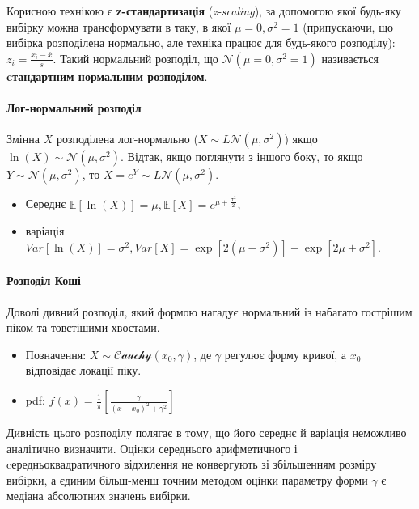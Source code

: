 \documentclass[
  11pt,
]{book}
\begin{document}
Корисною технікою є \textbf{z-стандартизація} (\emph{z-scaling}), за допомогою якої будь-яку вибірку можна трансформувати в таку, в якої \(\mu = 0, \sigma^2 = 1\) (припускаючи, що вибірка розподілена нормально, але техніка працює для будь-якого розподілу): \(z_i = \frac{x_i - \bar{x}}{s}\). Такий нормальний розподіл, що \(\mathcal{N} (\mu = 0, \sigma^2 = 1)\) називається \textbf{cтандартним нормальним розподілом}.

\paragraph{Лог-нормальний розподіл}\label{ux43bux43eux433-ux43dux43eux440ux43cux430ux43bux44cux43dux438ux439-ux440ux43eux437ux43fux43eux434ux456ux43b}

Змінна \(X\) розподілена лог-нормально (\(X \sim L\mathcal{N}(\mu, \sigma^2)\)) якщо \(\ln(X) \sim \mathcal{N}(\mu, \sigma^2)\). Відтак, якщо поглянути з іншого боку, то якщо \(Y \sim \mathcal{N}(\mu, \sigma^2)\), то \(X = e^Y \sim L\mathcal{N}(\mu, \sigma^2)\).

\begin{itemize}
\item
  Середнє \(\mathbb{E} [\ln (X)] = \mu, \mathbb{E}[X] = e^{\mu + \frac{\sigma^2}{2}}\),
\item
  варіація \(Var[\ln(X)] = \sigma^2, Var[X] = \exp [2(\mu - \sigma^2)] - \exp [2 \mu + \sigma^2]\).
\end{itemize}

\paragraph{Розподіл Коші}\label{ux440ux43eux437ux43fux43eux434ux456ux43b-ux43aux43eux448ux456}

Доволі дивний розподіл, який формою нагадує нормальний із набагато гострішим піком та товстішими хвостами.

\begin{itemize}
\item
  Позначення: \(X \sim \mathcal{Cauchy}(x_0, \gamma)\), де \(\gamma\) регулює форму кривої, а \(x_0\) відповідає локації піку.
\item
  pdf: \(f(x) = \frac{1}{\pi} \left[ \frac{\gamma}{(x - x_0)^2 + \gamma^2} \right]\)
\end{itemize}

Дивність цього розподілу полягає в тому, що його середнє й варіація неможливо аналітично визначити. Оцінки середнього арифметичного і cередньоквадратичного відхилення не конвергують зі збільшенням розміру вибірки, а єдиним більш-менш точним методом оцінки параметру форми \(\hat{\gamma}\) є медіана абсолютних значень вибірки.
\end{document}
